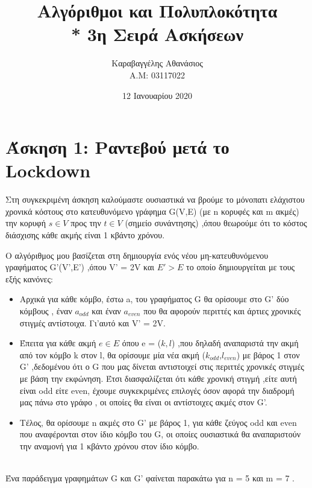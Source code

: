\documentclass[12pt,a4paper]{article}
\title{Αλγόριθμοι και Πολυπλοκότητα \\* 3η Σειρά Ασκήσεων}
\author{ Καραβαγγέλης Αθανάσιος \\ Α.Μ: 03117022}
\date{12 Ιανουαρίου 2020}
\begin{document}
\maketitle
\newpage

\section*{Άσκηση 1: Ραντεβού μετά το Lockdown } 

\par
Στη συγκεκριμένη άσκηση καλούμαστε ουσιαστικά να βρούμε το μόνοπατι ελάχιστου χρονικά κόστους στο κατευθυνόμενο γράφημα G(V,E) (με n κορυφές και m ακμές) την κορυφή $s \in V$ προς την $t \in V$ (σημείο συνάντησης) ,όπου θεωρούμε ότι το κόστος διάσχισης κάθε ακμής είναι 1 κβάντο χρόνου.\\
\par
Ο αλγόριθμος μου βασίζεται στη δημιουργία ενός νέου μη-κατευθυνόμενου γραφήματος G'(V',E') ,όπου V' = 2V και $ Ε' > Ε $ το οποίο δημιουργείται με τους εξής κανόνες:
\begin{itemize}
    \item Αρχικά για κάθε κόμβο, έστω a, του γραφήματος G θα ορίσουμε στο G' δύο κόμβους , έναν $a_{odd}$ και έναν $a_{even}$ που θα αφορούν περιττές και άρτιες χρονικές στιγμές αντίστοιχα. Γι'αυτό και V' = 2V.
    \item Έπειτα για κάθε ακμή $e \in E$ όπου e = ($k,l$) ,που δηλαδή αναπαριστά την ακμή από τον κόμβο k στον l, θα ορίσουμε μία νέα ακμή ($k_{odd}$,$l_{even}$) με βάρος 1 στον G' ,δεδομένου ότι ο G που μας δίνεται αντιστοιχεί στις περιττές χρονικές στιγμές με βάση την εκφώνηση. Έτσι διασφαλίζεται ότι κάθε χρονική στιγμή ,είτε αυτή είναι odd είτε even, έχουμε συγκεκριμένες επιλογές όσον αφορά την διαδρομή μας πάνω στο γράφο , οι οποίες θα είναι οι αντίστοιχες ακμές στον G'.
    \item Τέλος, θα ορίσουμε n ακμές στο G' με βάρος 1, για κάθε ζεύγος odd και even που αναφέρονται στον ίδιο κόμβο του G, οι οποίες ουσιαστικά θα αναπαριστούν την αναμονή για 1 κβάντο χρόνου στον ίδιο κόμβο.\\\\
\end{itemize} 

Ένα παράδειγμα γραφημάτων G και G' φαίνεται παρακάτω για n = 5 και m = 7 . \\
\end{document}
